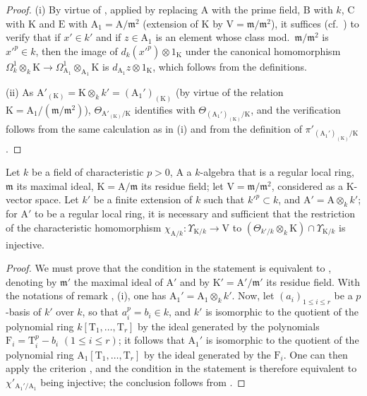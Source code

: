 \begin{proof}
(i) By virtue of , applied by replacing $\mathrm{A}$ with the prime field, $\mathrm{B}$ with $k$, $\mathrm{C}$ with $\mathrm{K}$ and $\mathrm{E}$ with $\mathrm{A}_1=\mathrm{A}/\mathfrak{m}^2$ (extension of $\mathrm{K}$ by $\mathrm{V}=\mathfrak{m}/\mathfrak{m}^2$), it suffices (cf.~) to verify that if $x'\in k'$ and if $z\in\mathrm{A}_1$ is an element whose class mod.~$\mathfrak{m}/\mathfrak{m}^2$ is $x'^p\in k$, then the image of $d_k(x'^p)\otimes 1_\mathrm{K}$ under the canonical homomorphism $\Omega^1_k\otimes_k\mathrm{K}\to\Omega^1_{\mathrm{A}_1}\otimes_{\mathrm{A}_1}\mathrm{K}$ is $d_{\mathrm{A}_1}z\otimes 1_\mathrm{K}$, which follows from the definitions.

(ii) As $\mathrm{A}'_{(\mathrm{K})}=\mathrm{K}\otimes_kk'=(\mathrm{A}_1')_{(\mathrm{K})}$ (by virtue of the relation $\mathrm{K}=\mathrm{A}_1/(\mathfrak{m}/\mathfrak{m}^2)$), $\Theta_{\mathrm{A}'_{(\mathrm{K})}/\mathrm{K}}$ identifies with $\Theta_{(\mathrm{A}_1')_{(\mathrm{K})}/\mathrm{K}}$, and the verification follows from the same calculation as in (i) and from the definition of $\pi'_{(\mathrm{A}_1')_{(\mathrm{K})}/\mathrm{K}}$.
\end{proof}

\begin{proposition}[22.5.7]
\label{0.22.5.7}
Let $k$ be a field of characteristic $p>0$, $\mathrm{A}$ a $k$-algebra that is a regular local ring, $\mathfrak{m}$ its maximal ideal, $\mathrm{K}=\mathrm{A}/\mathfrak{m}$ its residue field; let $\mathrm{V}=\mathfrak{m}/\mathfrak{m}^2$, considered as a $\mathrm{K}$-vector space.
Let $k'$ be a finite extension of $k$ such that $k'^p\subset k$, and $\mathrm{A}'=\mathrm{A}\otimes_kk'$; for $\mathrm{A}'$ to be a regular local ring, it is necessary and sufficient that the restriction of the characteristic homomorphism $\chi_{\mathrm{A}/k}:\Upsilon_{\mathrm{K}/k}\to\mathrm{V}$  to $(\Theta_{k'/k}\otimes_k\mathrm{K})\cap\Upsilon_{\mathrm{K}/k}$ is injective.
\end{proposition}

\begin{proof}
We must prove that the condition in the statement is equivalent to , denoting by $\mathfrak{m}'$ the maximal ideal of $\mathrm{A}'$ and by $\mathrm{K}'=\mathrm{A}'/\mathfrak{m}'$ its residue field.
With the notations of remark , (i), one has $\mathrm{A}_1'=\mathrm{A}_1\otimes_kk'$.
Now, let $(a_i)_{1\leq i\leq r}$ be a $p$-basis of $k'$ over $k$, so that $a_i^p=b_i\in k$, and $k'$ is isomorphic to the quotient of the polynomial ring
$k[\mathrm{T}_1,\ldots,\mathrm{T}_r]$ by the ideal generated by the polynomials $\mathrm{F}_i=\mathrm{T}_i^p-b_i$ $(1\leq i\leq r)$; it follows that $\mathrm{A}_1'$ is isomorphic to the quotient of the polynomial ring $\mathrm{A}_1[\mathrm{T}_1,\ldots,\mathrm{T}_r]$ by the ideal generated by the $\mathrm{F}_i$.
One can then apply the criterion , and the condition in the statement is therefore equivalent to $\chi'_{\mathrm{A}_1'/\mathrm{A}_1}$ being injective; the conclusion follows from .
\end{proof}

